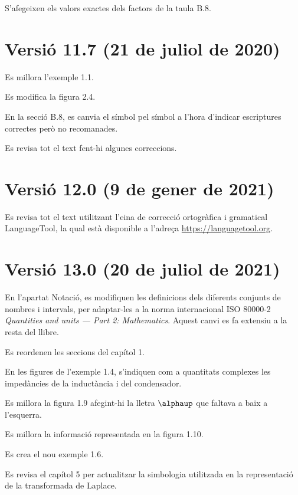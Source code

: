S'afegeixen els valors exactes dels factors de la taula B.8.


\section*{Versió 11.7 (21 de juliol de 2020)}

Es millora l'exemple 1.1.

Es modifica la figura 2.4.

En la secció B.8, es canvia el símbol \textcolor{Blue}\faQuestionCircle{} pel símbol \textcolor{Blue}\faExclamationTriangle{} a l'hora d'indicar escriptures correctes però no recomanades.

Es revisa tot el text fent-hi algunes correccions.


\section*{Versió 12.0 (9 de gener de 2021)}

Es revisa tot el text utilitzant l'eina de correcció ortogràfica i gramatical \textsf{LanguageTool}, la qual està disponible a l'adreça \href{https://languagetool.org/}{https:/\!\!/languagetool.org}.


\section*{Versió 13.0 (20 de juliol de 2021)}

En l'apartat Notació, es modifiquen les definicions dels diferents conjunts de nombres i intervals, per adaptar-les a la norma internacional ISO 80000-2 \textit{Quantities and units --- Part 2: Mathematics}. Aquest canvi es fa extensiu a la resta del llibre.

Es reordenen les seccions del capítol 1.

En les figures de l'exemple 1.4, s'indiquen com a quantitats complexes les impedàncies de la inductància i del condensador.

Es millora la figura 1.9 afegint-hi la lletra $\alphaup$ que faltava  a baix a l'esquerra.

Es millora la informació representada en la figura 1.10.

Es crea el nou exemple 1.6.

Es revisa el capítol 5 per actualitzar la simbologia utilitzada en la representació de la transformada de Laplace.

